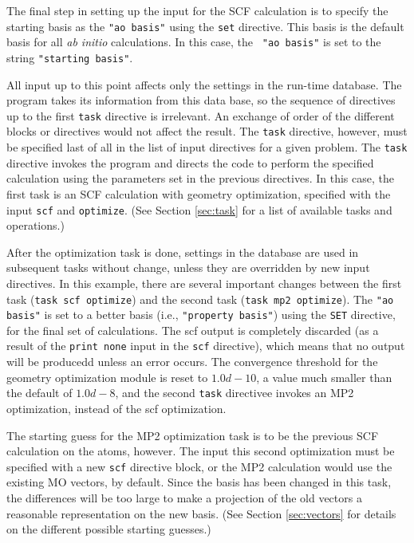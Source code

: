 The final step in setting up the input for the SCF calculation is to
specify the starting basis as the {\tt"ao basis"} using the 
{\tt set} directive.
This basis is the default
basis for all {\em ab initio} calculations.  In this case, the {\tt
"ao basis"} is set to the string {\tt "starting basis"}.

All input up to this point affects only the settings in the run-time database.
The program takes its information from this data base, so the
sequence of directives up to the first \verb+task+ directive is irrelevant.  
An exchange of order of the 
different blocks or
directives would not affect the result. 
The {\tt task} directive, however, must be specified last of all in the
list of input directives for
a given problem. The {\tt task} directive invokes the program and 
directs the code to perform the specified calculation
using the parameters set in the previous directives. In this case, the 
first task is an SCF calculation with geometry optimization, specified
with the input {\tt scf} and {\tt optimize}.   (See Section 
\ref{sec:task} for a list of available 
tasks and operations.)

After the optimization task is done, settings in the database are used
in subsequent tasks without change, unless they are overridden by new 
input directives.
In this example, there are several important changes between the first
task (\verb+task scf optimize+) and the second task (\verb+task mp2 optimize+).
The {\tt "ao basis"} is set to a 
better basis (i.e., {\tt "property basis"}) using the \verb+SET+ directive,
for the final set of 
calculations.  The scf output is completely 
discarded (as a result of the {\tt print  none} input in the {\tt scf} directive),
which means that no output will be producedd unless an error occurs.
The convergence threshold for the geometry optimization module is reset
to $1.0d-10$, a value much smaller than the default of $1.0d-8$, and
the second {\tt task} directivee invokes an MP2 optimization, instead of
the scf optimization.

The starting guess for the MP2 optimization task is to be the previous
SCF calculation 
on the atoms, however. The input this second optimization
must be specified with a new {\tt scf} directive block, or the MP2 calculation
would use the existing MO vectors, by default.  Since the basis 
has been changed in this task,
the differences will be too large to make a projection of the old vectors 
a reasonable representation on the new basis.  (See Section \ref{sec:vectors}
for details on the different possible starting guesses.)

